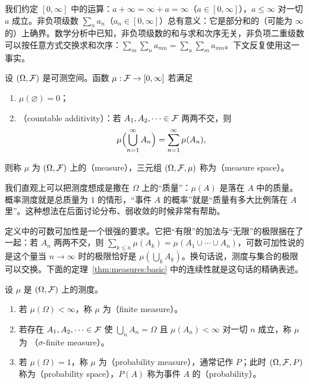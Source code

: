 
我们约定 $[0,\infty]$ 中的运算：$a+\infty=\infty+a=\infty$（$a\in[0,\infty]$），$a\leqslant\infty$ 对一切 $a$ 成立。非负项级数 $\sum_na_n$（$a_n\in[0,\infty]$）总有意义：它是部分和的（可能为 $\infty$ 的）上确界。数学分析中已知，非负项级数的和与求和次序无关，非负项二重级数可以按任意方式交换求和次序：$\sum_m\sum_na_{mn}=\sum_n\sum_ma_{mn}$。下文反复使用这一事实。

\begin{definition}[测度]\label{def:measures:measure}
设 $(\Omega,\mathcal{F})$ 是可测空间。函数 $\mu:\mathcal{F}\to[0,\infty]$ 若满足
\begin{enumerate}
\item $\mu(\varnothing)=0$；
\item {}（countable additivity）：若 $A_1,A_2,\dots\in\mathcal{F}$ 两两不交，则
\[
\mu\Bigl(\bigcup_{n=1}^\infty A_n\Bigr)=\sum_{n=1}^\infty\mu(A_n),
\]
\end{enumerate}
则称 $\mu$ 为 $(\Omega,\mathcal{F})$ 上的（measure），三元组 $(\Omega,\mathcal{F},\mu)$ 称为（measure space）。
\end{definition}

\begin{remark}
我们直观上可以把测度想成是撒在 $\Omega$ 上的“质量”：$\mu(A)$ 是落在 $A$ 中的质量。概率测度就是总质量为 $1$ 的情形，“事件 $A$ 的概率”就是“质量有多大比例落在 $A$ 里”。这种想法在后面讨论分布、弱收敛的时候非常有帮助。

定义中的可数可加性是一个很强的要求。它把“有限”的加法与“无限”的极限捆在了一起：若 $A_n$ 两两不交，则 $\sum_{k\leqslant n}\mu(A_k)=\mu(A_1\cup\cdots\cup A_n)$，可数可加性说的是这个量当 $n\to\infty$ 时的极限恰好是 $\mu(\bigcup_kA_k)$。换句话说，测度与集合的极限可以交换。下面的定理~\ref{thm:measures:basic} 中的连续性就是这句话的精确表述。
\end{remark}

\begin{definition}\label{def:measures:finite}
设 $\mu$ 是 $(\Omega,\mathcal{F})$ 上的测度。
\begin{enumerate}
\item 若 $\mu(\Omega)<\infty$，称 $\mu$ 为（finite measure）。
\item 若存在 $A_1,A_2,\dots\in\mathcal{F}$ 使 $\bigcup_nA_n=\Omega$ 且 $\mu(A_n)<\infty$ 对一切 $n$ 成立，称 $\mu$ 为 （$\sigma$-finite measure）。
\item 若 $\mu(\Omega)=1$，称 $\mu$ 为（probability measure），通常记作 $P$；此时 $(\Omega,\mathcal{F},P)$ 称为（probability space），$P(A)$ 称为事件 $A$ 的（probability）。
\end{enumerate}
\end{definition}

